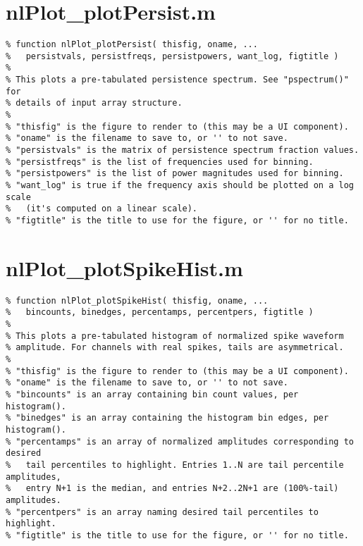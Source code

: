 \section{nlPlot\_plotPersist.m}

\begin{verbatim}
% function nlPlot_plotPersist( thisfig, oname, ...
%   persistvals, persistfreqs, persistpowers, want_log, figtitle )
%
% This plots a pre-tabulated persistence spectrum. See "pspectrum()" for
% details of input array structure.
%
% "thisfig" is the figure to render to (this may be a UI component).
% "oname" is the filename to save to, or '' to not save.
% "persistvals" is the matrix of persistence spectrum fraction values.
% "persistfreqs" is the list of frequencies used for binning.
% "persistpowers" is the list of power magnitudes used for binning.
% "want_log" is true if the frequency axis should be plotted on a log scale
%   (it's computed on a linear scale).
% "figtitle" is the title to use for the figure, or '' for no title.
\end{verbatim}

\section{nlPlot\_plotSpikeHist.m}

\begin{verbatim}
% function nlPlot_plotSpikeHist( thisfig, oname, ...
%   bincounts, binedges, percentamps, percentpers, figtitle )
%
% This plots a pre-tabulated histogram of normalized spike waveform
% amplitude. For channels with real spikes, tails are asymmetrical.
%
% "thisfig" is the figure to render to (this may be a UI component).
% "oname" is the filename to save to, or '' to not save.
% "bincounts" is an array containing bin count values, per histogram().
% "binedges" is an array containing the histogram bin edges, per histogram().
% "percentamps" is an array of normalized amplitudes corresponding to desired
%   tail percentiles to highlight. Entries 1..N are tail percentile amplitudes,
%   entry N+1 is the median, and entries N+2..2N+1 are (100%-tail) amplitudes.
% "percentpers" is an array naming desired tail percentiles to highlight.
% "figtitle" is the title to use for the figure, or '' for no title.
\end{verbatim}

